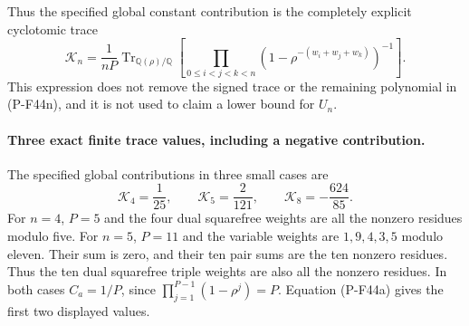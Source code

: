 Thus the specified global constant contribution is
the completely explicit cyclotomic trace
\[
 \mathcal K_n=\frac1{nP}
 \operatorname{Tr}_{\mathbb Q(\rho)/\mathbb Q}
 \left[
   \prod_{0\le i<j<k<n}
          (1-\rho^{-(w_i+w_j+w_k)})^{-1}
 \right].
 \tag{P-F44t}
\]
This expression does not remove the signed trace or the
remaining polynomial in (P-F44n), and it is not used to
claim a lower bound for $U_n$.

\paragraph{Three exact finite trace values, including a negative contribution.}
The specified global contributions in three small cases are
\[
              \mathcal K_4=\frac1{25},\qquad
              \mathcal K_5=\frac2{121},\qquad
              \mathcal K_8=-\frac{624}{85}.
 \tag{P-F44u}
\]
For $n=4$, $P=5$ and the four dual squarefree weights
are all the nonzero residues modulo five.
For $n=5$, $P=11$ and the variable weights are
$1,9,4,3,5$ modulo eleven. Their sum is zero, and their
ten pair sums are the ten nonzero residues. Thus the
ten dual squarefree triple weights are also all the
nonzero residues. In both cases
$C_a=1/P$, since
$\prod_{j=1}^{P-1}(1-\rho^j)=P$.
Equation (P-F44a) gives the first two displayed values.

